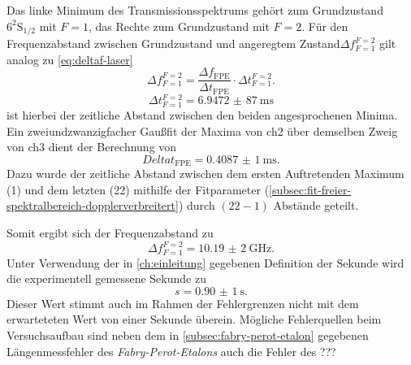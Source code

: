 \documentclass[../bericht.tex]{subfiles}
\begin{document}
        Das linke Minimum des Transmissionsspektrums geh\"ort zum Grundzustand $\mathrm{6^2S_{1/2}}$ mit $F=1$, das Rechte zum Grundzustand mit $F=2$. F\"ur den Frequenzabstand zwischen Grundzustand und angeregtem Zustand$\Delta f_{F=1}^{F=2}$ gilt analog zu \cref{eq:deltaf-laser}
        \begin{equation*}
          \Delta f_{F=1}^{F=2} = \frac{\Delta f_\mathrm{FPE}}{\Delta t_\mathrm{FPE}}\cdot \Delta t_{F=1}^{F=2}.
        \end{equation*}
        \begin{equation*}
          \Delta t_{F=1}^{F=2}= \SI{6,9472(87)}{\milli\second}
        \end{equation*}
        ist hierbei der zeitliche Abstand zwischen den beiden angesprochenen Minima. Ein zweiundzwanzigfacher Gau\ss{}fit der Maxima von ch2 \"uber demselben Zweig von ch3 dient der Berechnung von
        \begin{equation*}
          Delta t_\mathrm{FPE}=\SI{0,4087(1)}{\milli\second}.
        \end{equation*}
        Dazu wurde der zeitliche Abstand zwischen dem ersten Auftretenden Maximum (1) und dem letzten (22) mithilfe der Fitparameter (\cref{subsec:fit-freier-spektralbereich-dopplerverbreitert}) durch $(22-1)$ Abst\"ande geteilt.

        Somit ergibt sich der Frequenzabstand zu
        \begin{equation*}
          \Delta f_{F=1}^{F=2} = \SI{10,19(2)}{\giga\hertz}.
        \end{equation*}
        Unter Verwendung der in \cref{ch:einleitung} gegebenen Definition der Sekunde wird die experimentell gemessene Sekunde zu
        \begin{equation*}
          s=\SI{0,90(1)}{\second}.
        \end{equation*}
        Dieser Wert stimmt auch im Rahmen der Fehlergrenzen nicht mit dem erwarteteten Wert von einer Sekunde überein. Mögliche Fehlerquellen beim Versuchsaufbau sind neben dem in \cref{subsec:fabry-perot-etalon} gegebenen Längenmessfehler des \textit{Fabry-Perot-Etalons} auch die Fehler des ???
\end{document}
